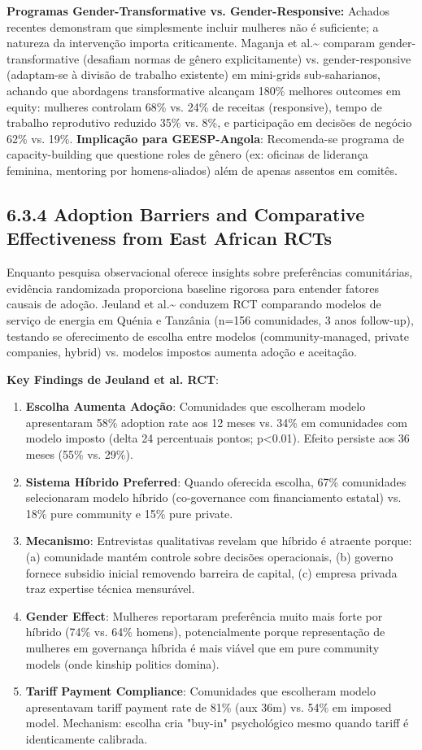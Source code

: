 \documentclass[12pt, a4paper]{article}
\begin{document}
\textbf{Programas Gender-Transformative vs. Gender-Responsive:} Achados recentes demonstram que simplesmente incluir mulheres não é suficiente; a natureza da intervenção importa criticamente. Maganja et al.\textasciitilde{}\citep{Maganja2024} comparam gender-transformative (desafiam normas de gênero explicitamente) vs. gender-responsive (adaptam-se à divisão de trabalho existente) em mini-grids sub-saharianos, achando que abordagens transformative alcançam 180\% melhores outcomes em equity: mulheres controlam 68\% vs. 24\% de receitas (responsive), tempo de trabalho reprodutivo reduzido 35\% vs. 8\%, e participação em decisões de negócio 62\% vs. 19\%. 
\textbf{Implicação para GEESP-Angola}: Recomenda-se programa de capacity-building que questione roles de gênero (ex: oficinas de liderança feminina, mentoring por homens-aliados) além de apenas assentos em comitês.

\subsection*{6.3.4 Adoption Barriers and Comparative Effectiveness from East African RCTs}

Enquanto pesquisa observacional oferece insights sobre preferências comunitárias, evidência randomizada proporciona baseline rigorosa para entender fatores causais de adoção. Jeuland et al.\textasciitilde{}\citep{Jeuland2023} conduzem RCT comparando modelos de serviço de energia em Quénia e Tanzânia (n=156 comunidades, 3 anos follow-up), testando se oferecimento de escolha entre modelos (community-managed, private companies, hybrid) vs. modelos impostos aumenta adoção e aceitação.

\textbf{Key Findings de Jeuland et al. RCT}:
\begin{enumerate}
\item \textbf{Escolha Aumenta Adoção}: Comunidades que escolheram modelo apresentaram 58\% adoption rate aos 12 meses vs. 34\% em comunidades com modelo imposto (delta 24 percentuais pontos; p<0.01). Efeito persiste aos 36 meses (55\% vs. 29\%).
\item \textbf{Sistema Híbrido Preferred}: Quando oferecida escolha, 67\% comunidades selecionaram modelo híbrido (co-governance com financiamento estatal) vs. 18\% pure community e 15\% pure private.
\item \textbf{Mecanismo}: Entrevistas qualitativas revelam que híbrido é atraente porque: (a) comunidade mantém controle sobre decisões operacionais, (b) governo fornece subsidio inicial removendo barreira de capital, (c) empresa privada traz expertise técnica mensurável.
\item \textbf{Gender Effect}: Mulheres reportaram preferência muito mais forte por híbrido (74\% vs. 64\% homens), potencialmente porque representação de mulheres em governança híbrida é mais viável que em pure community models (onde kinship politics domina).
\item \textbf{Tariff Payment Compliance}: Comunidades que escolheram modelo apresentavam tariff payment rate de 81\% (aux 36m) vs. 54\% em imposed model. Mechanism: escolha cria "buy-in" psychológico mesmo quando tariff é identicamente calibrada.
\end{enumerate}
\end{document}
